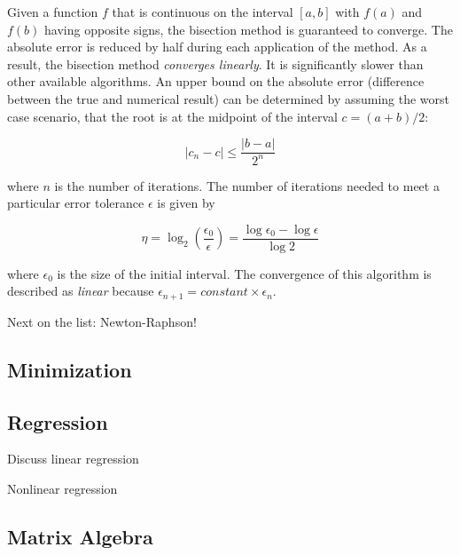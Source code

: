 Given a function $f$ that is continuous on the interval $[a,b]$ with $f(a)$ and $f(b)$ having opposite signs, the bisection method is guaranteed to converge. The absolute error is reduced by half during each application of the method. As a result, the bisection method \textit{converges linearly}. It is significantly slower than other available algorithms. An upper bound on the absolute error (difference between the true and numerical result) can be determined by assuming the worst case scenario, that the root is at the midpoint of the interval $c = (a+b)/2$:

\begin{equation}
|c_{n} - c| \le \frac{|b-a|}{2^{n}}
\end{equation}

where $n$ is the number of iterations. The number of iterations needed to meet a particular error tolerance $\epsilon$ is given by

\begin{equation}
\eta = \log_{2} (\frac{\epsilon_{0}}{\epsilon}) = \frac{\log \epsilon_{0} - \log \epsilon}{\log 2}
\end{equation}

where $\epsilon_{0}$ is the size of the initial interval. The convergence of this algorithm is described as \textit{linear} because $\epsilon_{n+1} = constant \times \epsilon_{n}$. 

Next on the list: Newton-Raphson!

\subsection{Minimization}

\subsection{Regression}

Discuss linear regression

Nonlinear regression


\subsection{Matrix Algebra}

